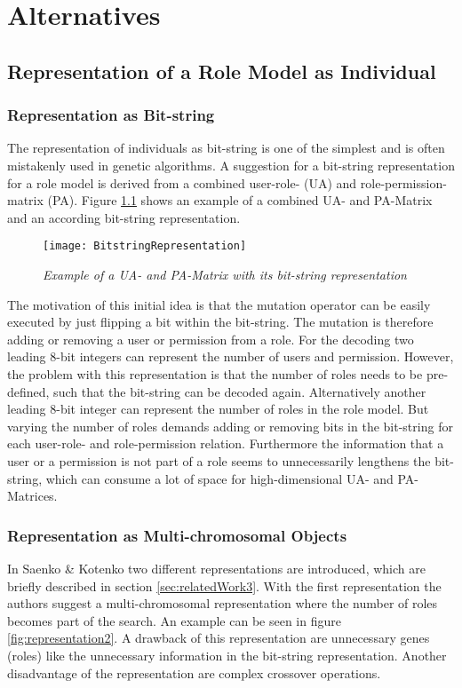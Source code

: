 \chapter{Alternatives}
\section{Representation of a Role Model as Individual}
\label{sec:A_representations}
	\subsection{Representation as Bit-string}
	The representation of individuals as bit-string is one of the simplest and is often mistakenly used in genetic algorithms\cite{Eiben}. A suggestion for a bit-string representation for a role model is derived from a combined user-role- (UA) and role-permission-matrix (PA). Figure \ref{fig:representation1} shows an example of a combined UA- and PA-Matrix and an according bit-string representation.
	
	\begin{figure}
		\centering
		\texttt{[image: BitstringRepresentation]}
		\caption{\textit{Example of a UA- and PA-Matrix with its bit-string representation}}
		\label{fig:representation1}
	\end{figure}
	
	The motivation of this initial idea is that the mutation operator can be easily executed by just flipping a bit within the bit-string. The mutation is therefore adding or removing a user or permission from a role. For the decoding two leading 8-bit integers can represent the number of users and permission. However, the problem with this representation is that the number of roles needs to be pre-defined, such that the bit-string can be decoded again. Alternatively another leading 8-bit integer can represent the number of roles in the role model. But varying the number of roles demands adding or removing bits in the bit-string for each user-role- and role-permission relation. Furthermore the information that a user or a permission is not part of a role seems to unnecessarily lengthens the bit-string, which can consume a lot of space for high-dimensional UA- and PA-Matrices.

	\subsection{Representation as Multi-chromosomal Objects}
	In Saenko \& Kotenko\cite{saenko2012design} two different representations are introduced, which are briefly described in section \ref{sec:relatedWork3}. With the first representation the authors suggest a multi-chromosomal representation where the number of roles becomes part of the search. An example can be seen in figure \ref{fig:representation2}. A drawback of this representation are unnecessary genes (roles) like the unnecessary information in the bit-string representation. Another disadvantage of the representation are complex crossover operations\cite{saenko2012design}.
	
